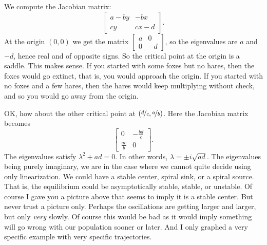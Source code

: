 \documentclass{ximera}
\begin{document}
We compute the Jacobian matrix:
\begin{equation*}
    \begin{bmatrix}
        a-by & -bx \\
        cy & cx-d
    \end{bmatrix} .
\end{equation*}
At the origin $(0,0)$ we get the matrix
$\left[ \begin{smallmatrix}
    a & 0 \\
    0 & -d
\end{smallmatrix} \right]$, 
so the eigenvalues are $a$ and $-d$, hence real and of opposite signs.  So the critical point at the origin is a saddle. This makes sense.  If you started with some foxes but no hares, then the foxes would go extinct, that is, you would approach the origin.  If you started with no foxes and a few hares, then the hares would keep multiplying without check, and so you would go away from the origin.

OK\@, how about the other critical point at $(\nicefrac{d}{c},\nicefrac{a}{b})$.  Here the Jacobian matrix becomes
\begin{equation*}
    \begin{bmatrix}
        0 & -\frac{bd}{c} \\
        \frac{ac}{b} & 0
    \end{bmatrix} .
\end{equation*}
The eigenvalues satisfy $\lambda^2 + ad = 0$.  In other words, $\lambda = \pm i \sqrt{ad}$.  The eigenvalues being purely imaginary, we are in the case where we cannot quite decide using only linearization.  We could have a stable center, spiral sink, or a spiral source.  That is, the equilibrium could be asymptotically stable, stable, or unstable.  Of course I gave you a picture above that seems to imply it is a stable center.  But never trust a picture only.  Perhaps the oscillations are getting larger and larger, but only \emph{very} slowly.  Of course this would be bad as it would imply something will go wrong with our population sooner or later.  And I only graphed a very specific example with very specific trajectories.
\end{document}
